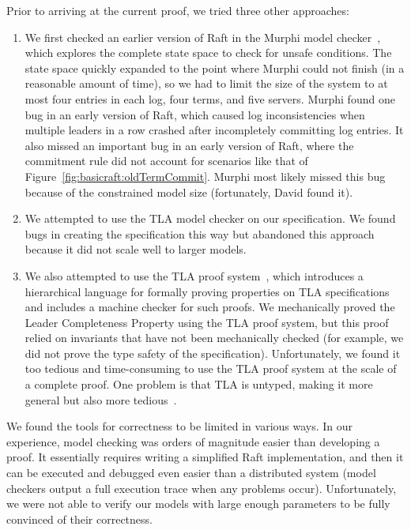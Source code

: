 Prior to arriving at the current proof, we tried three other approaches:
%
\begin{enumerate}
%
\item We first checked an earlier version of Raft in the Murphi model
checker~\cite{Dill:1992}, which explores the complete state space to
check for unsafe conditions. The state space quickly expanded to the
point where Murphi could not finish (in a reasonable amount of
time), so we had to limit the size of the
system to at most four entries in each log, four terms, and five
servers. Murphi found one bug in an early version of Raft, which caused
log inconsistencies when multiple leaders in a row crashed after
incompletely committing log entries.
It also missed an important bug in an early version of Raft,
where the commitment rule did not account for scenarios like that of
Figure~\ref{fig:basicraft:oldTermCommit}.
Murphi most likely missed this bug because of the constrained model size
(fortunately, David \mazieres{} found it).
%
\item We attempted to use the TLA model checker on our specification. We
found bugs in creating the specification this way but
abandoned this approach because it did not scale well to larger models.
%
\item We also attempted to use the TLA proof
system~\cite{Cousineau:2012}, which introduces a hierarchical language
for formally proving properties on TLA specifications and includes a
machine checker for such proofs. We mechanically proved the Leader
Completeness Property using the TLA proof system, but this proof relied
on invariants that have not been mechanically checked (for example, we
did not prove the type safety of the specification). Unfortunately, we
found it too tedious and time-consuming to use the TLA proof system at
the scale of a complete proof. One problem is that TLA is untyped,
making it more general but also more tedious~\cite{Lamport:1999}.
%
\end{enumerate}

We found the tools for correctness to be limited in various ways. In our
experience, model checking was orders of magnitude easier than
developing a proof. It essentially requires writing a simplified Raft
implementation, and then it can be executed and debugged even easier
than a distributed system (model checkers output a full execution trace
when any problems occur). Unfortunately, we were not able to verify our
models with large enough parameters to be fully convinced of their
correctness.

